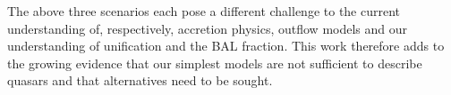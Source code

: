The above three scenarios each pose a different challenge to the current
understanding of, respectively, accretion physics, outflow models
and our understanding of unification and the BAL fraction. 
This work therefore adds to the growing evidence that our simplest models are not sufficient to
describe quasars and that alternatives need to be sought.


